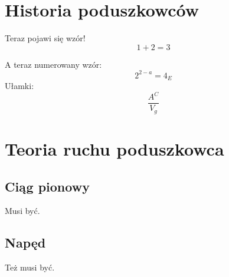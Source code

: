 \documentclass[../main.tex]{subfiles}
\begin{document}
\section{Historia poduszkowców}

Teraz pojawi się wzór!
$$1+2=3$$

A teraz numerowany wzór:
\begin{equation}
2^{2-a}=4_{E}
\end{equation}
Ułamki:$$\frac{A^C}{V_g}$$

\section{Teoria ruchu poduszkowca}

\subsection{Ciąg pionowy}
Musi być.
\subsection{Napęd}
Też musi być.
\end{document}
